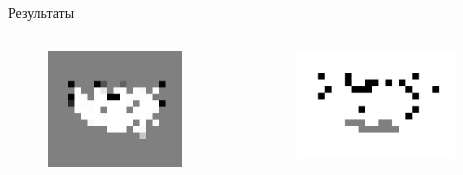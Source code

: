 \documentclass[9pt]{beamer}
\begin{document}
\begin{frame}{Результаты}
\begin{columns}
\begin{column}{0.5\textwidth}
  
  \begin{figure}[h]
    \centering
    \includegraphics[width=0.9\textwidth]{inv_room_ex.png}
  \end{figure}

\end{column}
\begin{column}{0.5\textwidth}
  \begin{figure}[h]
    \centering
    \includegraphics[width=0.9\textwidth]{room_ex.png}
  \end{figure}
\end{column}
\end{columns}
\end{frame}
\end{document}
